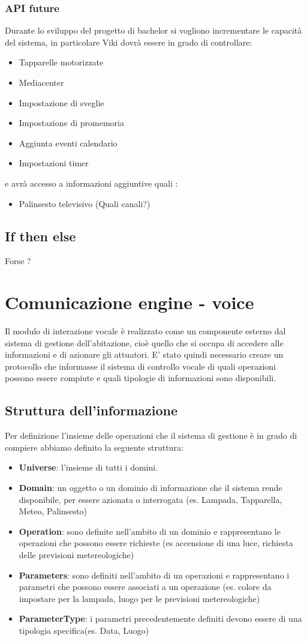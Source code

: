 \documentclass[twoside]{supsistudent}
\begin{document}
\subsection{API future}
Durante lo sviluppo del progetto di bachelor si vogliono incrementare le capacità del sistema, in particolare Viki dovrà essere in grado di controllare:
\begin{itemize}
  \item Tapparelle motorizzate
  \item Mediacenter
  \item Impostazione di sveglie
  \item Impostazione di promemoria
  \item Aggiunta eventi calendario
  \item Impostazioni timer
\end{itemize}
e avrà accesso a informazioni aggiuntive quali :
\begin{itemize}
  \item Palinsesto televisivo (Quali canali?)
\end{itemize}

\section{If then else}
Forse ?
\chapter{Comunicazione engine - voice }
Il modulo di interazione vocale è realizzato come un componente esterno dal sistema di gestione dell'abitazione, cioè quello che si occupa di accedere alle informazioni e di azionare gli attuatori. E' stato quindi necessario creare un protocollo che informasse il sistema di controllo vocale di quali operazioni possono essere compiute e quali tipologie di informazioni sono disponibili.
\section{Struttura dell'informazione}
Per definizione l'insieme delle operazioni che il sistema di gestione è in grado di compiere abbiamo definito la seguente struttura:
\begin{itemize}
	\item \textbf{Universe}: l'insieme di tutti i domini.
	\item \textbf{Domain}: un oggetto o un dominio di informazione che il sistema rende disponibile, per essere azionata o interrogata (es. Lampada, Tapparella, Meteo, Palinsesto)
	\item \textbf{Operation}: sono definite nell'ambito di un dominio e rappresentano le operazioni che possono essere richieste (es accensione di una luce, richiesta delle previsioni metereologiche)
	\item \textbf{Parameters}: sono definiti nell'ambito di un operazioni e rappresentano i parametri che possono essere associati a un operazione (es. colore da impostare per la lampada, luogo per le previsioni metereologiche)
	\item \textbf{ParameterType}: i parametri precedentemente definiti devono essere di una tipologia specifica(es. Data, Luogo)
\end{itemize}
\end{document}

